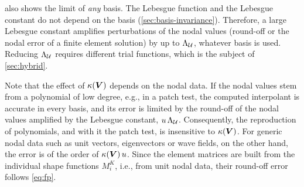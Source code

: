  also shows the limit of \emph{any} basis. The Lebesgue function and the Lebesgue constant do not depend on the basis (\cref{sec:basis-invariance}). Therefore, a large Lebesgue constant amplifies perturbations of the nodal values (round-off or the nodal error of a finite element solution) by up to $\Lambda_{\mathcal U}$, whatever basis is used. Reducing $\Lambda_{\mathcal U}$ requires different trial functions, which is the subject of \cref{sec:hybrid}.

Note that the effect of $\kappa(\bm{V})$ depends on the nodal data. If the nodal values stem from a polynomial of low degree, e.g., in a patch test, the computed interpolant is accurate in every basis, and its error is limited by the round-off of the nodal values amplified by the Lebesgue constant, $u\,\Lambda_{\mathcal U}$. Consequently, the reproduction of polynomials, and with it the patch test, is insensitive to $\kappa(\bm{V})$. For generic nodal data such as unit vectors, eigenvectors or wave fields, on the other hand, the error is of the order of $\kappa(\bm{V})\,u$. Since the element matrices are built from the individual shape functions $M_i^K$, i.e., from unit nodal data, their round-off error follows \cref{eq:fp}.
